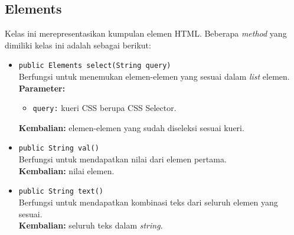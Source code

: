 \subsection{Elements}
Kelas ini merepresentasikan kumpulan elemen HTML. Beberapa \textit{method} yang dimiliki kelas ini adalah sebagai berikut:
\begin{itemize}
	    \item \texttt{public Elements select(String query)} \\
		Berfungsi untuk menemukan elemen-elemen yang sesuai dalam \textit{list} elemen. \\
		\textbf{Parameter:} 
		\begin{itemize}
			\item \texttt{query:} kueri CSS berupa CSS Selector.
		\end{itemize}
		\textbf{Kembalian:} elemen-elemen yang sudah diseleksi sesuai kueri.	
		
		\item \texttt{public String val()} \\
		Berfungsi untuk mendapatkan nilai dari elemen pertama. \\
		\textbf{Kembalian:} nilai elemen.	
		
		\item \texttt{public String text()} \\
		Berfungsi untuk mendapatkan kombinasi teks dari seluruh elemen yang sesuai. \\
		\textbf{Kembalian:} seluruh teks dalam \textit{string}.	
\end{itemize}


